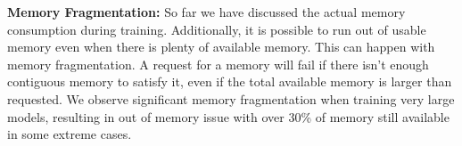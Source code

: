 \textbf{Memory Fragmentation: }  So far we have discussed the actual memory consumption during training. Additionally, it is possible to run out of usable memory even when there is plenty of available memory. This can happen with memory fragmentation. A request for a memory will fail if there isn't enough contiguous memory to satisfy it, even if the total available memory is larger than requested. We observe significant memory fragmentation when training very large models, resulting in out of memory issue with over 30\% of memory still available in some extreme cases.
\begin{comment}

Training a large model with many layers can runs out of memory during training, even when there is plenty of available memory. 

We find that activation checkpointing and backward propagation can cause heavy memory fragmentation, making significant portion of the GPU memory unusable, even when there is plenty of available memory. 
The memory fragmentation is caused by activation checkpointing and backward propagation allocating long term and shot term memory in an interleaved fashion. During the forward propagation, temporary buffers are created in between the creation of each activation checkpoint, causing memory fragmentation. Similarly, in backward propagation working memory is allocated between computation of the gradients, also causing memory fragmentation. We find that for models with hundreds of layers, memory fragmentation can make over 30\% of the GPU memory unusable.
\end{comment}
